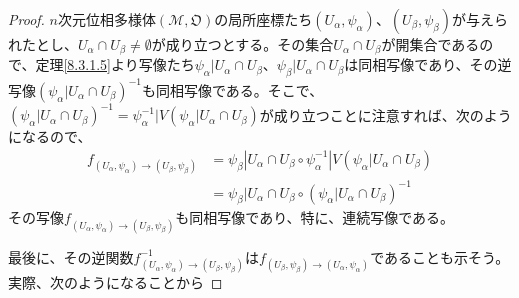 \documentclass[dvipdfmx]{jsarticle}
\begin{document}
\begin{proof}
$n$次元位相多様体$\left( \mathcal{M},\mathfrak{O} \right)$の局所座標たち$\left( U_{\alpha},\psi_{\alpha} \right)$、$\left( U_{\beta},\psi_{\beta} \right)$が与えられたとし、$U_{\alpha} \cap U_{\beta} \neq \emptyset$が成り立つとする。その集合$U_{\alpha} \cap U_{\beta}$が開集合であるので、定理\ref{8.3.1.5}より写像たち$\psi_{\alpha}|U_{\alpha} \cap U_{\beta}$、$\psi_{\beta}|U_{\alpha} \cap U_{\beta}$は同相写像であり、その逆写像$\left( \psi_{\alpha}|U_{\alpha} \cap U_{\beta} \right)^{- 1}$も同相写像である。そこで、$\left( \psi_{\alpha}|U_{\alpha} \cap U_{\beta} \right)^{- 1} = \psi_{\alpha}^{- 1}|V\left( \psi_{\alpha}|U_{\alpha} \cap U_{\beta} \right)$が成り立つことに注意すれば、次のようになるので、
\begin{align*}
f_{\left( U_{\alpha},\psi_{\alpha} \right) \rightarrow \left( U_{\beta},\psi_{\beta} \right)} &= \psi_{\beta}\left| U_{\alpha} \cap U_{\beta} \circ \psi_{\alpha}^{- 1} \right|V\left( \psi_{\alpha}|U_{\alpha} \cap U_{\beta} \right)\\
&= \psi_{\beta}|U_{\alpha} \cap U_{\beta} \circ \left( \psi_{\alpha}|U_{\alpha} \cap U_{\beta} \right)^{- 1}
\end{align*}
その写像$f_{\left( U_{\alpha},\psi_{\alpha} \right) \rightarrow \left( U_{\beta},\psi_{\beta} \right)}$も同相写像であり、特に、連続写像である。\par
最後に、その逆関数$f_{\left( U_{\alpha},\psi_{\alpha} \right) \rightarrow \left( U_{\beta},\psi_{\beta} \right)}^{- 1}$は$f_{\left( U_{\beta},\psi_{\beta} \right) \rightarrow \left( U_{\alpha},\psi_{\alpha} \right)}$であることも示そう。実際、次のようになることから
\begin{comment}
\begin{align*}
&\quad f_{\left( U_{\beta},\psi_{\beta} \right) \rightarrow \left( U_{\alpha},\psi_{\alpha} \right)} \circ f_{\left( U_{\alpha},\psi_{\alpha} \right) \rightarrow \left( U_{\beta},\psi_{\beta} \right)}\\
&= \psi_{\alpha}|U_{\alpha} \cap U_{\beta} \circ \psi_{\beta}^{- 1}|V\left( \psi_{\beta}|U_{\alpha} \cap U_{\beta} \right) \circ \psi_{\beta}|U_{\alpha} \cap U_{\beta} \circ \psi_{\alpha}^{- 1}|V\left( \psi_{\alpha}|U_{\alpha} \cap U_{\beta} \right)\\
&= U_{\alpha} \cap U_{\beta}\overset{\psi_{\alpha}}{\rightarrow}V\left( \psi_{\alpha}|U_{\alpha} \cap U_{\beta} \right) \circ V\left( \psi_{\beta}|U_{\alpha} \cap U_{\beta} \right)\overset{\psi_{\beta}^{- 1}}{\rightarrow}U_{\alpha} \cap U_{\beta} \circ U_{\alpha} \cap U_{\beta}\overset{\psi_{\beta}}{\rightarrow}V\left( \psi_{\beta}|U_{\alpha} \cap U_{\beta} \right) \circ V\left( \psi_{\alpha}|U_{\alpha} \cap U_{\beta} \right)\overset{\psi_{\alpha}^{- 1}}{\rightarrow}U_{\alpha} \cap U_{\beta}\\

\end{comment}
\end{proof}
\end{document}
